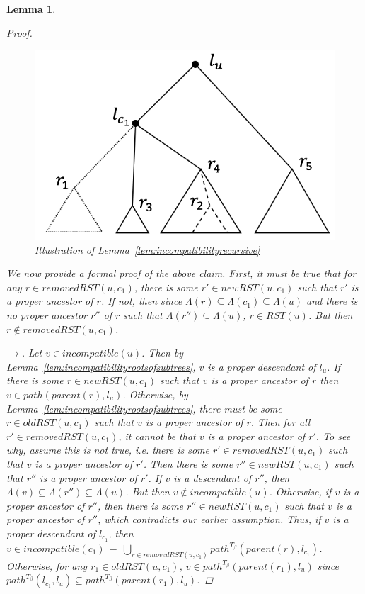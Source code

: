 \documentclass{article}
\newcommand{\leafset}{\Lambda}
\newtheorem{incompatibilityrecursive}[incompatibility]{Lemma}
\begin{document}
\begin{incompatibilityrecursive}
\begin{proof}
            \begin{figure}[h]
                \includegraphics[scale=0.5]{incompatibilityrecursive}
                \centering
                \caption{Illustration of Lemma~\ref{lem:incompatibilityrecursive}}
                \label{fig:incompatibilityrecursive}
            \end{figure}

            We now provide a formal proof of the above claim. First, it must be true that for any $r \in removedRST(u, c_1)$, there is some $r' \in newRST(u, c_1)$ such that $r'$ is a proper ancestor of $r$. If not, then since $\leafset(r) \subseteq \leafset(c_1) \subseteq \leafset(u)$ and there is no proper ancestor $r''$ of $r$ such that $\leafset(r'') \subseteq \leafset(u)$, $r \in RST(u)$. But then $r \not\in removedRST(u, c_1)$.

            $\longrightarrow$. Let $v \in incompatible(u)$. Then by Lemma~\ref{lem:incompatibilityrootsofsubtrees}, $v$ is a proper descendant of $l_u$. If there is some $r \in newRST(u, c_1)$ such that $v$ is a proper ancestor of $r$ then $v \in path(parent(r), l_u)$. Otherwise, by Lemma~\ref{lem:incompatibilityrootsofsubtrees}, there must be some $r \in oldRST(u, c_1)$ such that $v$ is a proper ancestor of $r$. Then for all $r' \in removedRST(u, c_1)$, it cannot be that $v$ is a proper ancestor of $r'$. To see why, assume this is not true, i.e. there is some $r' \in removedRST(u, c_1)$ such that $v$ is a proper ancestor of $r'$. Then there is some $r'' \in newRST(u, c_1)$ such that $r''$ is a proper ancestor of $r'$. If $v$ is a descendant of $r''$, then $\leafset(v) \subseteq \leafset(r'') \subseteq \leafset(u)$. But then $v \not\in incompatible(u)$. Otherwise, if $v$ is a proper ancestor of $r''$, then there is some $r'' \in newRST(u, c_1)$ such that $v$ is a proper ancestor of $r''$, which contradicts our earlier assumption. Thus, if $v$ is a proper descendant of $l_{c_1}$, then $v \in incompatible(c_1)\ -\ \bigcup_{r \in removedRST(u, c_1)} path^{T_\beta}(parent(r), l_{c_1})$. Otherwise, for any $r_1 \in oldRST(u, c_1)$, $v \in path^{T_\beta}(parent(r_1), l_u)$ since $path^{T_\beta}(l_{c_1}, l_u) \subseteq path^{T_\beta}(parent(r_1), l_u)$.


\end{proof}
\end{incompatibilityrecursive}
\end{document}

